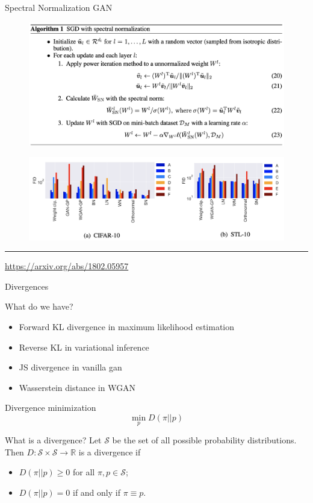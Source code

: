 \documentclass{beamer}
\newcommand{\bbR}{\mathbb{R}}
\newcommand{\cS}{\mathcal{S}}
\begin{document}
\begin{frame}{Spectral Normalization GAN}
	\begin{figure}
		\centering
		\includegraphics[width=0.85\linewidth]{figs/sngan_pseudocode}
	\end{figure}
	\begin{figure}
		\centering
		\includegraphics[width=0.85\linewidth]{figs/sngan_fids}
	\end{figure}
	\vfill
	\hrule\medskip 
	{\scriptsize \href{https://arxiv.org/abs/1802.05957}{https://arxiv.org/abs/1802.05957}}
\end{frame}
\begin{frame}{Divergences}
	\begin{block}{What do we have?}
		\begin{itemize}
			\item Forward KL divergence in maximum likelihood estimation
			\item Reverse KL in variational inference
			\item JS divergence in  vanilla gan
			\item Wasserstein distance in WGAN
		\end{itemize}
	\end{block}
	\begin{block}{Divergence minimization}
		\vspace{-0.3cm}
		\[
			\min_p D(\pi || p)
		\]
		\vspace{-0.5cm}
	\end{block}
	\begin{block}{What is a divergence?}
		Let $\cS$ be the set of all possible probability distributions. Then $D: \cS \times \cS \rightarrow \bbR$ is a divergence if 
		\begin{itemize}
			\item $D(\pi || p) \geq 0$ for all $\pi, p \in \cS$;
			\item $D(\pi || p) = 0$ if and only if $\pi \equiv p$.
		\end{itemize}
	\end{block}
\end{frame}
\end{document}
